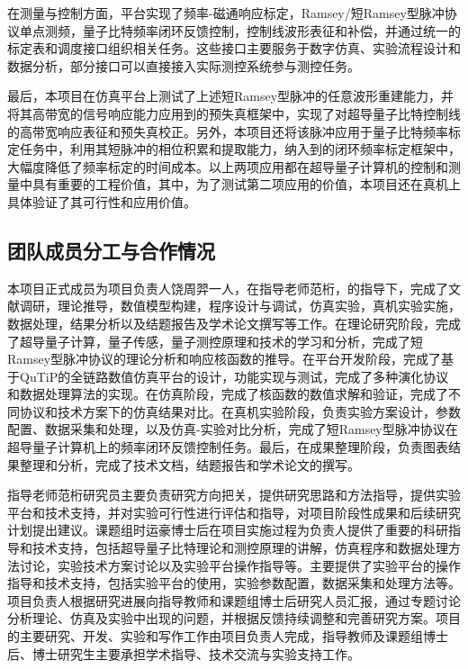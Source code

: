\documentclass[a4paper,12pt]{article}
\begin{document}
\par 在测量与控制方面，平台实现了频率-磁通响应标定，Ramsey/短Ramsey型脉冲协议单点测频，量子比特频率闭环反馈控制，控制线波形表征和补偿，并通过统一的标定表和调度接口组织相关任务。这些接口主要服务于数字仿真、实验流程设计和数据分析，部分接口可以直接接入实际测控系统参与测控任务。

\par \begin{mdframed}最后，本项目在仿真平台上测试了上述短Ramsey型脉冲的任意波形重建能力，并将其高带宽的信号响应能力应用到\citet{rol_time-domain_2020}的预失真框架中，实现了对超导量子比特控制线的高带宽响应表征和预失真校正。另外，本项目还将该脉冲应用于量子比特频率标定任务中，利用其短脉冲的相位积累和提取能力，纳入到\citet{vepsalainen2022improving}的闭环频率标定框架中，大幅度降低了频率标定的时间成本。以上两项应用都在超导量子计算机的控制和测量中具有重要的工程价值，其中，为了测试第二项应用的价值，本项目还在真机上具体验证了其可行性和应用价值。\end{mdframed}

\vspace{1cm}

\subsection{团队成员分工与合作情况}
本项目正式成员为项目负责人饶周羿一人，在指导老师范桁，的指导下，完成了文献调研，理论推导，数值模型构建，程序设计与调试，仿真实验，真机实验实施，数据处理，结果分析以及结题报告及学术论文撰写等工作。在理论研究阶段，完成了超导量子计算，量子传感，量子测控原理和技术的学习和分析，完成了短Ramsey型脉冲协议的理论分析和响应核函数的推导。在平台开发阶段，完成了基于QuTiP的全链路数值仿真平台的设计，功能实现与测试，完成了多种演化协议和数据处理算法的实现。在仿真阶段，完成了核函数的数值求解和验证，完成了不同协议和技术方案下的仿真结果对比。在真机实验阶段，负责实验方案设计，参数配置、数据采集和处理，以及仿真-实验对比分析，完成了短Ramsey型脉冲协议在超导量子计算机上的频率闭环反馈控制任务。最后，在成果整理阶段，负责图表结果整理和分析，完成了技术文档，结题报告和学术论文的撰写。

\par 指导老师范桁研究员主要负责研究方向把关，提供研究思路和方法指导，提供实验平台和技术支持，并对实验可行性进行评估和指导，对项目阶段性成果和后续研究计划提出建议。课题组时运豪博士后在项目实施过程为负责人提供了重要的科研指导和技术支持，包括超导量子比特理论和测控原理的讲解，仿真程序和数据处理方法讨论，实验技术方案讨论以及实验平台操作指导等。主要提供了实验平台的操作指导和技术支持，包括实验平台的使用，实验参数配置，数据采集和处理方法等。项目负责人根据研究进展向指导教师和课题组博士后研究人员汇报，通过专题讨论分析理论、仿真及实验中出现的问题，并根据反馈持续调整和完善研究方案。项目的主要研究、开发、实验和写作工作由项目负责人完成，指导教师及课题组博士后、博士研究生主要承担学术指导、技术交流与实验支持工作。
\vspace{1cm}
\end{document}
